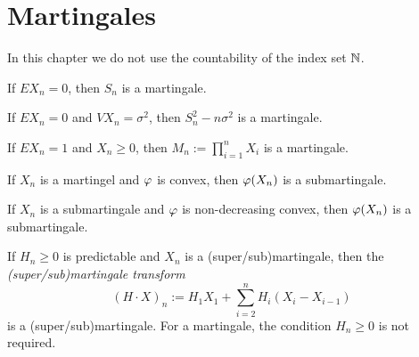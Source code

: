 \documentclass{../../large}
\begin{document}
\section{Martingales}
In this chapter we do not use the countability of the index set $\mathbb{N}$.

\begin{prb}
\begin{parts}
\item If $EX_n=0$, then $S_n$ is a martingale.
\item If $EX_n=0$ and $VX_n=\sigma^2$, then $S_n^2-n\sigma^2$ is a martingale.
\item If $EX_n=1$ and $X_n\ge0$, then $M_n:=\prod_{i=1}^nX_i$ is a martingale.
\item If $X_n$ is a martingel and $\varphi$ is convex, then $\varphi(X_n)$ is a submartingale.
\item If $X_n$ is a submartingale and $\varphi$ is non-decreasing convex, then $\varphi(X_n)$ is a submartingale.
\item If $H_n\ge0$ is predictable and $X_n$ is a (super/sub)martingale, then the \emph{(super/sub)martingale transform}
\[(H\cdot X)_n:=H_1X_1+\sum_{i=2}^nH_i(X_i-X_{i-1})\]
is a (super/sub)martingale.
For a martingale, the condition $H_n\ge0$ is not required.
\end{parts}
\end{prb}
\end{document}
